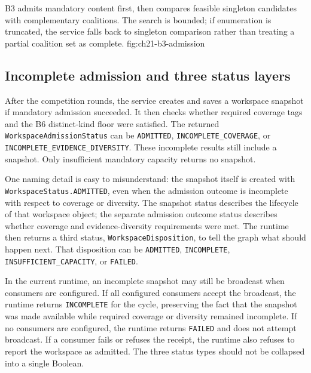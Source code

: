   {B3 admits mandatory content first, then compares feasible singleton candidates with complementary coalitions. The search is bounded; if enumeration is truncated, the service falls back to singleton comparison rather than treating a partial coalition set as complete.}
  {fig:ch21-b3-admission}

\subsection{Incomplete admission and three status layers}
\label{subsec:ch21-b3-status}

After the competition rounds, the service creates and saves a workspace snapshot if mandatory admission succeeded. It then checks whether required coverage tags and the B6 distinct-kind floor were satisfied. The returned \texttt{Workspace\allowbreak{}Admission\allowbreak{}Status} can be \texttt{ADMITTED}, \texttt{INCOMPLETE\_COVERAGE}, or \texttt{INCOMPLETE\_\allowbreak{}EVIDENCE\_\allowbreak{}DIVERSITY}. These incomplete results still include a snapshot. Only insufficient mandatory capacity returns no snapshot.

One naming detail is easy to misunderstand: the snapshot itself is created with \texttt{Workspace\allowbreak{}Status.\allowbreak{}ADMITTED}, even when the admission outcome is incomplete with respect to coverage or diversity. The snapshot status describes the lifecycle of that workspace object; the separate admission outcome status describes whether coverage and evidence-diversity requirements were met. The runtime then returns a third status, \texttt{Workspace\allowbreak{}Disposition}, to tell the graph what should happen next. That disposition can be \texttt{ADMITTED}, \texttt{INCOMPLETE}, \texttt{INSUFFICIENT\_\allowbreak{}CAPACITY}, or \texttt{FAILED}.

In the current runtime, an incomplete snapshot may still be broadcast when consumers are configured. If all configured consumers accept the broadcast, the runtime returns \texttt{INCOMPLETE} for the cycle, preserving the fact that the snapshot was made available while required coverage or diversity remained incomplete. If no consumers are configured, the runtime returns \texttt{FAILED} and does not attempt broadcast. If a consumer fails or refuses the receipt, the runtime also refuses to report the workspace as admitted. The three status types should not be collapsed into a single Boolean.

